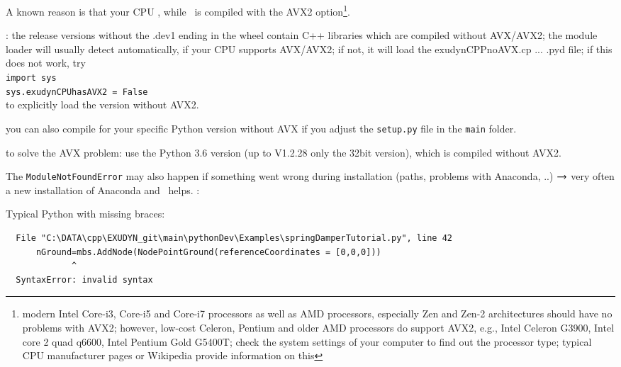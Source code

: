\item[$\ra$] A known reason is that your CPU , while \codeName\ is compiled with the AVX2 option\footnote{modern Intel Core-i3, Core-i5 and Core-i7 processors as well as AMD processors, especially Zen and Zen-2 architectures should have no problems with AVX2; however, low-cost Celeron, Pentium and older AMD processors do  support AVX2, e.g.,  Intel Celeron G3900, Intel core 2 quad q6600, Intel Pentium Gold G5400T; check the system settings of your computer to find out the processor type; typical CPU manufacturer pages or Wikipedia provide information on this}.
\item[$\ra$] : the release versions without the .dev1 ending in the wheel contain C++ libraries which are compiled without AVX/AVX2; the module loader will usually detect automatically, if your CPU supports AVX/AVX2; if not, it will load the exudynCPPnoAVX.cp ... .pyd file; if this does not work, try\\
\texttt{import sys}\\
\texttt{sys.exudynCPUhasAVX2 = False}\\
to explicitly load the version without AVX2.
\item[$\ra$] you can also compile for your specific Python version without AVX if you adjust the \texttt{setup.py} file in the \texttt{main} folder.
\item[$\ra$]  to solve the AVX problem: use the Python 3.6 version (up to \codeName V1.2.28 only the 32bit version), which is compiled without AVX2.
\item[$\ra$] The \texttt{ModuleNotFoundError} may also happen if something went wrong during installation (paths, problems with Anaconda, ..) $\ra$ very often a new installation of Anaconda and \codeName\ helps.
\ei
\ei
\noindent {}:
\bi
  \item Typical Python  with missing braces:
\plainlststyle
\begin{lstlisting}
  File "C:\DATA\cpp\EXUDYN_git\main\pythonDev\Examples\springDamperTutorial.py", line 42
      nGround=mbs.AddNode(NodePointGround(referenceCoordinates = [0,0,0]))
             ^
  SyntaxError: invalid syntax
\end{lstlisting}

